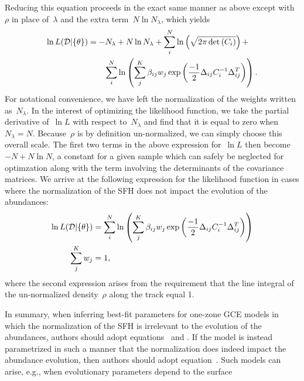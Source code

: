 \documentclass[ms.tex]{subfiles}
\begin{document}
Reducing this equation proceeds in the exact same manner as above except with
$\rho$ in place of~$\lambda$ and the extra term~$N \ln N_\lambda$, which
yields
\begin{equation}\begin{split}
\ln L(\mathcal{D} | \{\theta\}) &= -N_\lambda + N \ln N_\lambda +
\sum_i^N \ln \left(\sqrt{2\pi \det{(C_i)}}\right) +
\\
&\qquad \sum_i^N \ln \left(
\sum_j^K \beta_{ij} w_j
\exp\left(\frac{-1}{2}\Delta_{ij} C_i^{-1} \Delta_{ij}^T\right)\right).
\end{split}\end{equation}
For notational convenience, we have left the normalization of the weights
written as~$N_\lambda$.
In the interest of optimizing the likelihood function, we take the partial
derivative of~$\ln L$ with respect to~$N_\lambda$ and find that it is equal to
zero when~$N_\lambda = N$.
Because~$\rho$ is by definition un-normalized, we can simply choose this
overall scale.
The first two terms in the above expression for~$\ln L$ then become
$-N + N \ln N$, a constant for a given sample which can safely be neglected
for optimzation along with the term involving the determinants of the
covariance matrices.
We arrive at the following expression for the likelihood function in cases
where the normalization of the SFH does not impact the evolution of the
abundances:
\begin{subequations}\begin{align}
\ln L(\mathcal{D} | \{\theta\}) &= \sum_i^N \ln \left( \sum_j^K \beta_{ij} w_j
\exp\left(\frac{-1}{2}\Delta_{ij} C_i^{-1} \Delta_{ij}^T\right) \right)
\label{eq:lnL_fracweight}
\\
\sum_j^K w_j &= 1,
\label{eq:lnL_fracweightsum}
\end{align}\end{subequations}
where the second expression arises from the requirement that the line integral
of the un-normalized density~$\rho$ along the track equal 1.
\par
In summary, when inferring best-fit parameters for one-zone GCE models in which
the normalization of the SFH is irrelevant to the evolution of the abundances,
authors should adopt equations~ and
.
If the model is instead parametrized in such a manner that the normalization
does indeed impact the abundance evolution, then authors should adopt
equation~.
Such models can arise, e.g., when evolutionary parameters depend to the surface
\end{document}
